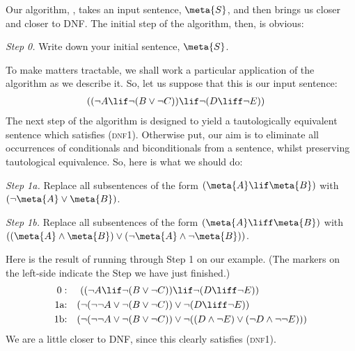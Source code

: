 Our algorithm, \intoDNF{}, takes an input sentence, $\meta{S}$, and then brings us closer and closer to DNF. The initial step of the algorithm, then, is obvious:
	\begin{ebullet}
		\item[\emph{Step 0.}] Write down your initial sentence, $\meta{S}$.
	\end{ebullet}
To make matters tractable, we shall work a particular application of the algorithm as we describe it. So, let us suppose that this is our input sentence:
	\begin{align*}
	 ((\lnot A \lif \lnot (B \lor \lnot C)) &\lif \lnot (D \liff \lnot E))
	\end{align*}
The next step of the algorithm is designed to yield a tautologically equivalent sentence which satisfies (\textsc{dnf1}). Otherwise put, our aim is to eliminate all occurrences of conditionals and biconditionals from a sentence, whilst preserving tautological equivalence. So, here is what we should do:
	\begin{ebullet}
		\item[\emph{Step 1a.}] Replace all subsentences of the form $(\meta{A} \lif \meta{B})$ with $(\lnot\meta{A} \lor \meta{B})$. 
		\item[\emph{Step 1b.}] Replace all subsentences of the form  $(\meta{A} \liff \meta{B})$ with $((\meta{A} \land \meta{B}) \lor (\lnot \meta{A} \land \lnot\meta{B}))$. 
	\end{ebullet}
Here is the result of running through Step 1 on our example. (The markers on the left-side indicate the Step we have just finished.)
{\small	\begin{align*}
	 0: & & ((\lnot A \lif \lnot (B \lor \lnot  C)) &\lif \lnot (D \liff \lnot E))\\
	 \text{1a:} & & (\lnot (\lnot \lnot A \lor \lnot (B \lor \lnot  C)) &\lor \lnot (D \liff \lnot E)) \\
	 \text{1b:} & & (\lnot (\lnot \lnot A \lor \lnot (B \lor \lnot  C)) &\lor \lnot ((D \land \lnot E) \lor (\lnot D \land \lnot \lnot E)))
	\end{align*}}
We are a little closer to DNF, since this clearly satisfies (\textsc{dnf1}). 

